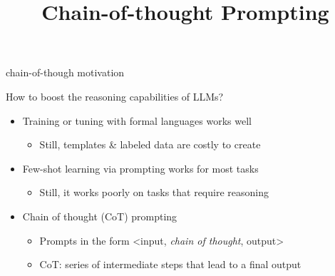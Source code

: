 



\newcommand{\learninggoals}{
\item illustrate chain-of-thought and point out the benefits it brings to LLMs
\item illustrate tree-of-thought and point out the benefits it brings to LLMs 
}

\def\myblue#1{\textcolor{texblue}{#1}}

\title{Chain-of-thought Prompting}
\date{}




\begin{vbframe}{chain-of-though motivation}

\vfill

How to boost the reasoning capabilities of LLMs? 

\begin{itemize}
\item Training or tuning with formal languages works well
    \begin{itemize}
    \item Still, templates \& labeled data are costly to create
    \end{itemize}
\item Few-shot learning via prompting works for most tasks
    \begin{itemize}
    \item Still, it works poorly on tasks that require reasoning
    \end{itemize}
\item Chain of thought (CoT) prompting
    \begin{itemize}
    \item Prompts in the form <input, \textit{chain of thought}, output>
    \item CoT: series of intermediate steps that lead to a final output
    \end{itemize}

\end{itemize}

\vfill

\end{vbframe}


